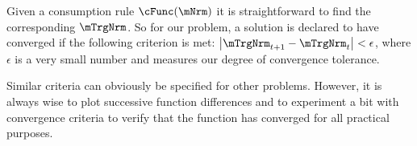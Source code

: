 \documentclass[titlepage, headings=optiontotocandhead]{\econtex}
\begin{document}
Given a consumption rule $\cFunc(\mNrm)$ it is straightforward to find
the corresponding $\mTrgNrm$.  So for our problem, a solution is declared
to have converged if the following criterion is met:
$\left|\mTrgNrm_{t+1}-\mTrgNrm_{t}\right| < \epsilon$, where $\epsilon$ is
a very small number and measures our degree of convergence tolerance.

Similar criteria can obviously be specified for other problems.
However, it is always wise to plot successive function differences and
to experiment a bit with convergence criteria to verify that the
function has converged for all practical purposes.

\end{document}
